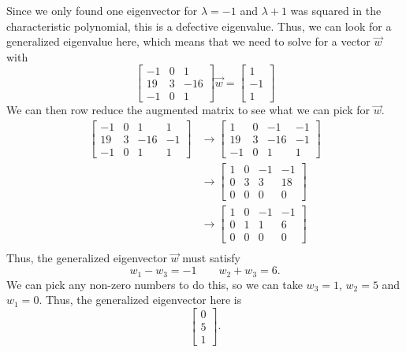 \begin{exampleSol}
Since we only found one eigenvector for $\lambda = -1$ and $\lambda + 1$ was squared in the characteristic polynomial, this is a defective eigenvalue. Thus, we can look for a generalized eigenvalue here, which means that we need to solve for a vector $\vec{w}$ with
\[ 
\begin{bmatrix} -1 & 0 & 1 \\ 19 & 3 & -16 \\ -1 & 0 & 1 \end{bmatrix} \vec{w} = \begin{bmatrix} 1 \\ -1 \\ 1 \end{bmatrix}
\]
We can then row reduce the augmented matrix to see what we can pick for $\vec{w}$. 
\[
\begin{split}
\begin{bmatrix} -1 & 0 & 1 & 1 \\ 19 & 3 & -16 & -1\\ -1 & 0 & 1 & 1 \end{bmatrix} &\rightarrow \begin{bmatrix} 1 & 0 & -1 & -1 \\ 19 & 3 & -16 & -1\\ -1 & 0 & 1 & 1 \end{bmatrix} \\
&\rightarrow \begin{bmatrix} 1 & 0 & -1 & -1 \\ 0 & 3 & 3 & 18\\ 0 & 0 & 0 & 0 \end{bmatrix} \\
&\rightarrow \begin{bmatrix} 1 & 0 & -1 & -1 \\ 0 & 1 & 1 & 6\\ 0 & 0 & 0 & 0 \end{bmatrix} \\
\end{split}
\]
Thus, the generalized eigenvector $\vec{w}$ must satisfy
\[ w_1 - w_3 = -1 \qquad w_2 + w_3 = 6. \] We can pick any non-zero numbers to do this, so we can take $w_3 = 1$, $w_2 = 5$ and $w_1 = 0$. Thus, the generalized eigenvector here is
\[ \begin{bmatrix} 0 \\ 5 \\ 1 \end{bmatrix}.\]
\end{exampleSol}

